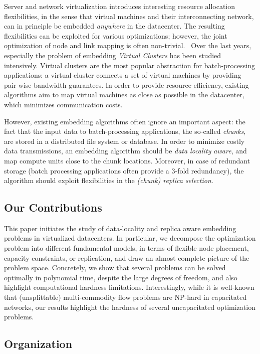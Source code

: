 \documentclass[9pt,twocolumn]{scrartcl}
\begin{document}
Server and network virtualization introduces interesting resource allocation flexibilities,
in the sense that virtual machines and their interconnecting network,
can in principle be embedded \emph{anywhere} in the datacenter. The resulting flexibilities
can be exploited for various optimizations; 
however, the joint optimization of node and link mapping is often non-trivial.~\cite{pb-embed} 
Over the last years, especially the problem of embedding
\emph{Virtual Clusters} has been studied intensively. Virtual clusters are the most popular abstraction for batch-processing applications:
a virtual cluster connects a set of virtual machines by providing pair-wise bandwidth guarantees.
In order to provide resource-efficiency, existing algorithms aim to map virtual machines as close as possible
in the datacenter, which minimizes communication costs.~\cite{oktopus,proteus}

However, existing embedding algorithms often ignore an important aspect: the fact that the input data
to batch-processing applications,
the so-called \emph{chunks}, are stored in a distributed file system or database. In order to minimize
costly data transmissions, an embedding algorithm should be \emph{data locality aware},
and map compute units close to the chunk locations. Moreover, in case of redundant storage (batch processing
applications often provide a 3-fold redundancy), the algorithm should exploit flexibilities in
the \emph{(chunk) replica selection}.

\subsection{Our Contributions}

This paper initiates the study of data-locality and replica aware embedding problems in virtualized datacenters.
In particular, we decompose the optimization problem into different fundamental models, in terms of flexible
node placement, capacity constraints, or replication,
and draw an almost complete picture of the problem space. Concretely, we show that several problems
can be solved optimally in polynomial time, despite the large degrees of freedom, and also highlight
computational hardness limitations. Interestingly, while it is well-known that (unsplittable) multi-commodity flow
problems are NP-hard in capacitated networks, our results highlight the hardness of several uncapacitated 
optimization problems.


\subsection{Organization}
\end{document}
